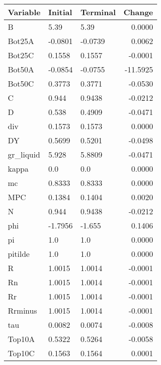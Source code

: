\begin{table}
\centering
\label{tab:stst_comparison_end_L_limit_permanent}
\begin{tabular}{lllr}
\toprule
                Variable & Initial & Terminal &   Change \\
\midrule
                       B &    5.39 &     5.39 &   0.0000 \\
                  Bot25A & -0.0801 &  -0.0739 &   0.0062 \\
                  Bot25C &  0.1558 &   0.1557 &  -0.0001 \\
                  Bot50A & -0.0854 &  -0.0755 & -11.5925 \\
                  Bot50C &  0.3773 &   0.3771 &  -0.0530 \\
                       C &   0.944 &   0.9438 &  -0.0212 \\
                       D &   0.538 &   0.4909 &  -0.0471 \\
                     div &  0.1573 &   0.1573 &   0.0000 \\
                      DY &  0.5699 &   0.5201 &  -0.0498 \\
               gr\_liquid &   5.928 &   5.8809 &  -0.0471 \\
                   kappa &     0.0 &      0.0 &   0.0000 \\
                      mc &  0.8333 &   0.8333 &   0.0000 \\
                     MPC &  0.1384 &   0.1404 &   0.0020 \\
                       N &   0.944 &   0.9438 &  -0.0212 \\
                     phi & -1.7956 &   -1.655 &   0.1406 \\
                      pi &     1.0 &      1.0 &   0.0000 \\
                 pitilde &     1.0 &      1.0 &   0.0000 \\
                       R &  1.0015 &   1.0014 &  -0.0001 \\
                      Rn &  1.0015 &   1.0014 &  -0.0001 \\
                      Rr &  1.0015 &   1.0014 &  -0.0001 \\
                 Rrminus &  1.0015 &   1.0014 &  -0.0001 \\
                     tau &  0.0082 &   0.0074 &  -0.0008 \\
                  Top10A &  0.5322 &   0.5264 &  -0.0058 \\
                  Top10C &  0.1563 &   0.1564 &   0.0001 \\

\end{tabular}
\end{table}
